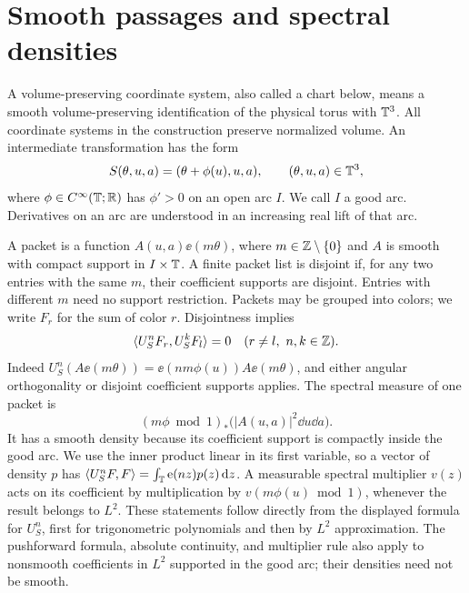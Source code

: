 \section{Smooth passages and spectral densities}\label{sec:passages}

A volume-preserving coordinate system, also called a chart below, means
a smooth volume-preserving identification of the physical torus with $\mathbb T^3$.
All coordinate systems in the construction preserve normalized volume.
An intermediate transformation has the form
\begin{equation}\label{eq:twist}
 S(\theta,u,a)=(\theta+\phi(u),u,a),
 \qquad (\theta,u,a)\in\mathbb T^3,
\end{equation}
where $\phi\in C^\infty(\mathbb T;\mathbb R)$ has $\phi'>0$ on an open arc
$I$. We call $I$ a good arc. Derivatives on an arc are understood in an
increasing real lift of that arc.

A packet is a function $A(u,a)\ee(m\theta)$, where
$m\in\mathbb Z\setminus\{0\}$ and $A$ is smooth with compact support in
$I\times\mathbb T$. A finite packet list is disjoint if, for any two entries with
the same $m$, their coefficient supports are disjoint. Entries with
different $m$ need no support restriction. Packets may be grouped into
colors; we write $F_r$ for the sum of color $r$. Disjointness implies
\begin{equation}\label{eq:packet-orthogonality}
 \langle U_S^n F_r,U_S^k F_l\rangle=0
 \quad(r\ne l,\ n,k\in\mathbb Z).
\end{equation}
Indeed $U_S^n(A\ee(m\theta))=\ee(nm\phi(u))A\ee(m\theta)$,
and either angular orthogonality or disjoint coefficient supports applies.
The spectral measure of one packet is
\begin{equation}\label{eq:packet-spectral-measure}
 (m\phi\bmod1)_*\bigl(|A(u,a)|^2\dd u\dd a\bigr).
\end{equation}
It has a smooth density because its coefficient support is compactly
inside the good arc. We use the inner product linear in its first
variable, so a vector of density $p$ has
$\langle U_S^nF,F\rangle=\int_\mathbb T\operatorname{e}(nz)p(z)\,\mathrm d z$.
A measurable spectral multiplier $v(z)$ acts on its
coefficient by multiplication by $v(m\phi(u)\bmod1)$, whenever the result
belongs to $L^2$. These statements follow directly from the displayed
formula for $U_S^n$, first for trigonometric polynomials and then by
$L^2$ approximation. The pushforward formula, absolute continuity,
and multiplier rule also apply to nonsmooth coefficients in $L^2$
supported in the good arc; their densities need not be smooth.

